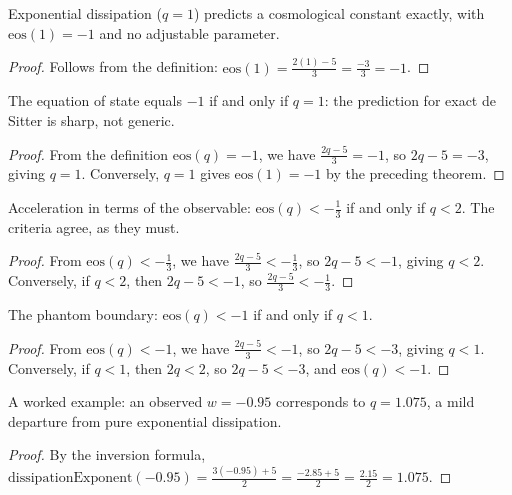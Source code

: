 \begin{theorem}
Exponential dissipation ($q = 1$) predicts a cosmological constant exactly, with $\text{eos}(1) = -1$ and no adjustable parameter.
\begin{proof}
Follows from the definition: $\text{eos}(1) = \frac{2(1) - 5}{3} = \frac{-3}{3} = -1$.
\end{proof}
\end{theorem}

\begin{theorem}
The equation of state equals $-1$ if and only if $q = 1$: the prediction for exact de Sitter is sharp, not generic.
\begin{proof}
From the definition $\text{eos}(q) = -1$, we have $\frac{2q - 5}{3} = -1$, so $2q - 5 = -3$, giving $q = 1$.  Conversely, $q = 1$ gives $\text{eos}(1) = -1$ by the preceding theorem.
\end{proof}
\end{theorem}

\begin{theorem}
Acceleration in terms of the observable: $\text{eos}(q) < -\frac{1}{3}$ if and only if $q < 2$.  The criteria agree, as they must.
\begin{proof}
From $\text{eos}(q) < -\frac{1}{3}$, we have $\frac{2q - 5}{3} < -\frac{1}{3}$, so $2q - 5 < -1$, giving $q < 2$.  Conversely, if $q < 2$, then $2q - 5 < -1$, so $\frac{2q - 5}{3} < -\frac{1}{3}$.
\end{proof}
\end{theorem}

\begin{theorem}
The phantom boundary: $\text{eos}(q) < -1$ if and only if $q < 1$.
\begin{proof}
From $\text{eos}(q) < -1$, we have $\frac{2q - 5}{3} < -1$, so $2q - 5 < -3$, giving $q < 1$.  Conversely, if $q < 1$, then $2q < 2$, so $2q - 5 < -3$, and $\text{eos}(q) < -1$.
\end{proof}
\end{theorem}

\begin{theorem}
A worked example: an observed $w = -0.95$ corresponds to $q = 1.075$, a mild departure from pure exponential dissipation.
\begin{proof}
By the inversion formula, $\text{dissipationExponent}(-0.95) = \frac{3(-0.95) + 5}{2} = \frac{-2.85 + 5}{2} = \frac{2.15}{2} = 1.075$.
\end{proof}
\end{theorem}

